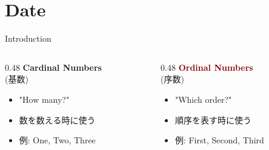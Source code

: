 \documentclass[aspectratio=169,xcolor={dvipsnames,table}]{beamer}
\begin{document}
\section{Date}
\begin{frame}{Introduction}
    \begin{columns}
        \begin{column}{0.48\textwidth}
            \textbf{\textcolor{NavyBlue}{Cardinal Numbers}} \\
            (基数)
            \vspace{0.5em}
            \begin{itemize}
                \item "How many?"
                \item 数を数える時に使う
                \item 例: One, Two, Three
            \end{itemize}
        \end{column}
        \begin{column}{0.48\textwidth}
            \textbf{\textcolor{Maroon}{Ordinal Numbers}} \\
            (序数)
            \vspace{0.5em}
            \begin{itemize}
                \item "Which order?"
                \item 順序を表す時に使う
                \item 例: First, Second, Third
            \end{itemize}
        \end{column}
    \end{columns}
\end{frame}
\end{document}
